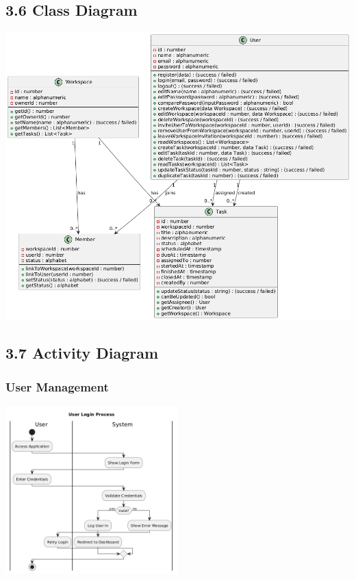 \subsection*{3.6 Class Diagram}
\begin{center}
  \includegraphics[width=1\textwidth]{assets/class_diagram.png}
\end{center}

\subsection*{3.7 Activity Diagram}

\subsubsection*{User Management}
\begin{center}
    \includegraphics[width=0.5\textwidth]{assets/activity_diagrams/user_login.png}
\end{center}



